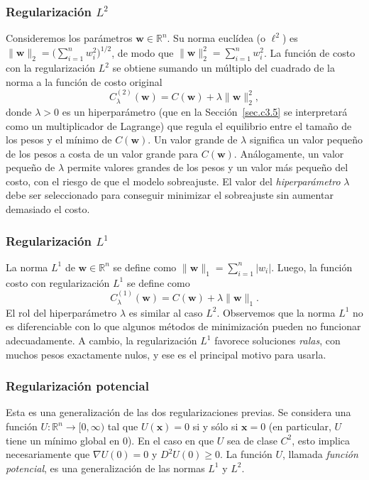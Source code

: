 \documentclass[12pt, a4paper]{amsbook}
\newcommand{\R}{{\mathbb R}}
\newcommand{\ww}{{\mathbf w}}
\newcommand{\xx}{{\mathbf x}}
\theoremstyle{remark}
\theoremstyle{definition}
\numberwithin{section}{chapter}
\numberwithin{subsection}{section}
\numberwithin{equation}{section}
\numberwithin{figure}{chapter}
\begin{document}
\subsubsection*{Regularización $L^2$} Consideremos los parámetros $\ww\in\R^n$. Su norma euclídea (o $\ell^2$) es $\|\ww\|_2=\bigl(\sum_{i=1}^n w_i^2\bigr)^{1/2}$, de modo que $\|\ww\|_2^2 = \sum_{i=1}^n w_i^2$. La función de costo con la regularización $L^2$ se obtiene sumando un múltiplo del cuadrado de la norma a la función de costo original
$$
C^{(2)}_\lambda(\ww) = C(\ww) + \lambda \|\ww\|_2^2,
$$
donde $\lambda>0$ es un hiperparámetro (que en la Sección~\ref{sec.c3.5} se interpretará como un multiplicador de Lagrange) que regula el equilibrio entre el tamaño de los pesos y el mínimo de $C(\ww)$. Un valor grande de $\lambda$ significa un valor pequeño de los pesos a costa de un valor grande para $C(\ww)$. Análogamente, un valor pequeño de $\lambda$ permite valores grandes de los pesos y un valor más pequeño del costo, con el riesgo de que el modelo sobreajuste. El valor del {\em hiperparámetro} $\lambda$ debe ser seleccionado para conseguir minimizar el sobreajuste sin aumentar demasiado el costo.

\subsubsection*{Regularización $L^1$} La norma $L^1$ de $\ww\in\R^n$ se define como $\|\ww\|_1 = \sum_{i=1}^n |w_i|$. Luego, la función costo con regularización $L^1$ se define como
$$
C^{(1)}_\lambda(\ww) = C(\ww) + \lambda \|\ww\|_1.
$$
El rol del hiperparámetro $\lambda$ es similar al caso $L^2$. Observemos que la norma $L^1$ no es diferenciable con lo que algunos métodos de minimización pueden no funcionar adecuadamente. A cambio, la regularización $L^1$ favorece soluciones {\em ralas}, con muchos pesos exactamente nulos, y ese es el principal motivo para usarla.

\subsubsection*{Regularización potencial} Esta es una generalización de las dos regularizaciones previas. Se considera una función $U\colon \R^n\to[0,\infty)$ tal que $U(\xx)=0$ si y sólo si $\xx=0$ (en particular, $U$ tiene un mínimo global en $0$). En el caso en que $U$ sea de clase $C^2$, esto implica necesariamente que $\nabla U(0)=0$ y $D^2U(0)\ge 0$. La función $U$, llamada {\em función potencial}, es una generalización de las normas $L^1$ y $L^2$.
\end{document}
